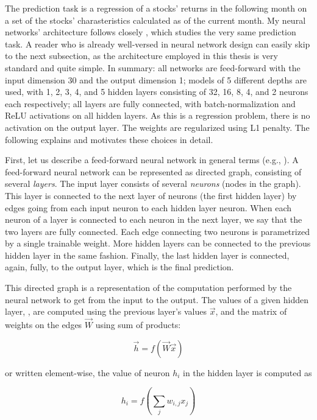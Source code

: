 	The prediction task is a regression of a stocks' returns in the following month on a set of the stocks' charasteristics calculated as of the current month. My neural networks' architecture follows closely \cite{gu2020empirical}, which studies the very same prediction task. A reader who is already well-versed in neural network design can easily skip to the next subsection, as the architecture employed in this thesis is very standard and quite simple. In summary: all networks are feed-forward with the input dimension 30 and the output dimension 1; models of 5 different depths are used, with 1, 2, 3, 4, and 5 hidden layers consisting of 32, 16, 8, 4, and 2 neurons each respectively; all layers are fully connected, with batch-normalization \citep{ioffe2015batch} and ReLU activations on all hidden layers. As this is a regression problem, there is no activation on the output layer. The weights are regularized using L1 penalty. The following explains and motivates these choices in detail.
	
	First, let us describe a feed-forward neural network in general terms (e.g., \cite{goodfellow2016deep}). A feed-forward neural network can be represented as directed graph, consisting of several \textit{layers}. The input layer consists of several \textit{neurons} (nodes in the graph). This layer is connected to the next layer of neurons (the first hidden layer) by edges going from each input neuron to each hidden layer neuron. When each neuron of a layer is connected to each neuron in the next layer, we say that the two layers are fully connected. Each edge connecting two neurons is parametrized by a single trainable weight. More hidden layers can be connected to the previous hidden layer in the same fashion. Finally, the last hidden layer is connected, again, fully, to the output layer, which is the final prediction.
	
	This directed graph is a representation of the computation performed by the neural network to get from the input to the output. The values of a given hidden layer, , are computed using the previous layer's values $\vec{x}$, and the matrix of weights on the edges $\vec{W}$ using sum of products: 
	
	\begin{equation}
		\vec{h} = f(\vec{W}\vec{x})
	\end{equation}
	
	or written element-wise, the value of neuron $h_i$ in the hidden layer is computed as 
	
	\begin{equation}
		h_i = f \left( \sum_{j}w_{i,j}x_j \right)
	\end{equation}
	
